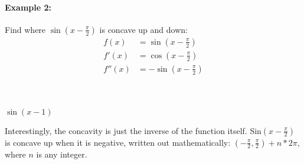 \documentclass[../revisedmain.tex]{subfiles}
\begin{document}
\paragraph{Example 2:}Find where \(\sin(x-\frac{\pi}{2})\) is concave up and down:
\begin{equation}
	\begin{split}
	f(x)&=\sin(x-\frac{\pi}{2})\\
	f'(x)&=\cos(x-\frac{\pi}{2})\\
	f''(x)&=-\sin(x-\frac{\pi}{2})\\
	\end{split}
\end{equation}
	\\
\begin{center}
	\small{\(\sin(x-1)\)}
\end{center}
\par Interestingly, the concavity is just the inverse of the function itself. Sin\((x-\frac{\pi}{2})\) is concave up when it is negative, written out mathematically: \((-\frac{\pi}{2},\frac{\pi}{2})+n*2\pi\), where \(n\) is any integer.\\\\
\end{document}
